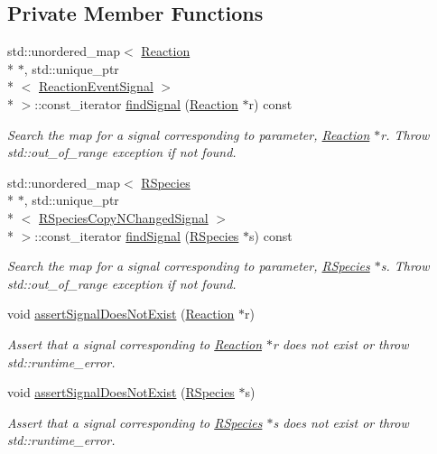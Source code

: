 \subsection*{Private Member Functions}
\begin{DoxyCompactItemize}
\item 
std\-::unordered\-\_\-map$<$ \hyperlink{classchem_1_1Reaction}{Reaction} \\*
$\ast$, std\-::unique\-\_\-ptr\\*
$<$ \hyperlink{namespacechem_a85c409cf931d658d253b62ab5ad35781}{Reaction\-Event\-Signal} $>$\\*
 $>$\-::const\-\_\-iterator \hyperlink{classchem_1_1ChemSignal_a9a5a2a4cc5b08e0dfef1c0aad2afdf97}{find\-Signal} (\hyperlink{classchem_1_1Reaction}{Reaction} $\ast$r) const 
\begin{DoxyCompactList}\small\item\em Search the map for a signal corresponding to parameter, \hyperlink{classchem_1_1Reaction}{Reaction} $\ast$r. Throw std\-::out\-\_\-of\-\_\-range exception if not found. \end{DoxyCompactList}\item 
std\-::unordered\-\_\-map$<$ \hyperlink{classchem_1_1RSpecies}{R\-Species} \\*
$\ast$, std\-::unique\-\_\-ptr\\*
$<$ \hyperlink{namespacechem_a09aea7e5a24368c13cd7d8d25b4d884e}{R\-Species\-Copy\-N\-Changed\-Signal} $>$\\*
 $>$\-::const\-\_\-iterator \hyperlink{classchem_1_1ChemSignal_ae10bf98b41aa071c0595c9ae2c320858}{find\-Signal} (\hyperlink{classchem_1_1RSpecies}{R\-Species} $\ast$s) const 
\begin{DoxyCompactList}\small\item\em Search the map for a signal corresponding to parameter, \hyperlink{classchem_1_1RSpecies}{R\-Species} $\ast$s. Throw std\-::out\-\_\-of\-\_\-range exception if not found. \end{DoxyCompactList}\item 
void \hyperlink{classchem_1_1ChemSignal_a149065dec5ac319e5218bc158e6ec1ce}{assert\-Signal\-Does\-Not\-Exist} (\hyperlink{classchem_1_1Reaction}{Reaction} $\ast$r)
\begin{DoxyCompactList}\small\item\em Assert that a signal corresponding to \hyperlink{classchem_1_1Reaction}{Reaction} $\ast$r does not exist or throw std\-::runtime\-\_\-error. \end{DoxyCompactList}\item 
void \hyperlink{classchem_1_1ChemSignal_a20c30365e810b3b88e87500e08627d11}{assert\-Signal\-Does\-Not\-Exist} (\hyperlink{classchem_1_1RSpecies}{R\-Species} $\ast$s)
\begin{DoxyCompactList}\small\item\em Assert that a signal corresponding to \hyperlink{classchem_1_1RSpecies}{R\-Species} $\ast$s does not exist or throw std\-::runtime\-\_\-error. \end{DoxyCompactList}\end{DoxyCompactItemize}
